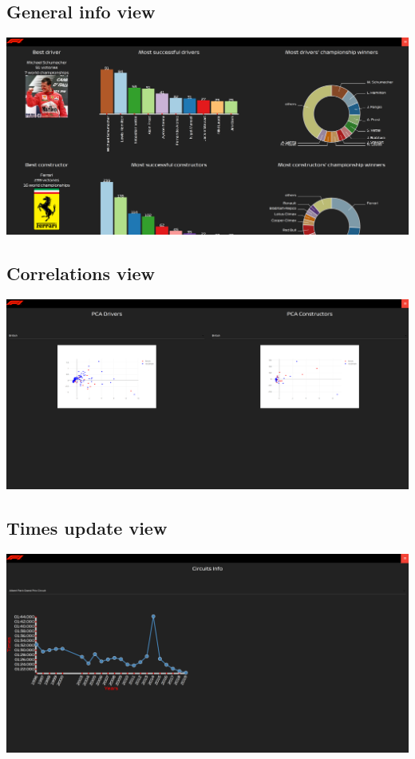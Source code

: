 \documentclass[10pt,twocolumn,letterpaper]{article}
\begin{document}
\subsection{General info view}
\begin{center}
	\centering
	\includegraphics[width=\columnwidth]{generalinfo}
\end{center}

\subsection{Correlations view}
\begin{center}
	\centering
	\includegraphics[width=\columnwidth]{correlations}
\end{center}

\subsection{Times update view}
\begin{center}
	\centering
	\includegraphics[width=\columnwidth]{timesupdate}
\end{center}
\end{document}
